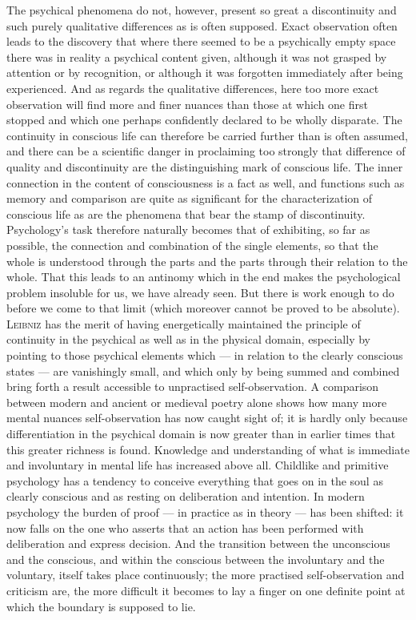 \documentclass[12pt,a4paper]{book}
\newcommand{\opage}[1]{\marginnote{\footnotesize\textit{[#1]}}}
\begin{document}
The psychical phenomena do not, however, present so great a discontinuity and
such purely qualitative differences as is often supposed. Exact observation
often leads to the discovery that where there seemed to be a psychically empty
space there was in reality a psychical content given, although it was not
grasped by attention or by recognition, or although it was forgotten
immediately after being experienced. And as regards the qualitative differences,
here too more exact observation will find more and finer nuances than those at
which one first stopped and which one perhaps confidently \opage{19}declared to be wholly
disparate. The continuity in conscious life can therefore be carried further
than is often assumed, and there can be a scientific danger in proclaiming too
strongly that difference of quality and discontinuity are the distinguishing
mark of conscious life. The inner connection in the content of consciousness is
a fact as well, and functions such as memory and comparison are quite as
significant for the characterization of conscious life as are the phenomena that
bear the stamp of discontinuity. Psychology's task therefore naturally becomes
that of exhibiting, so far as possible, the connection and combination of the
single elements, so that the whole is understood through the parts and the parts
through their relation to the whole. That this leads to an antinomy which in the
end makes the psychological problem insoluble for us, we have already seen. But
there is work enough to do before we come to that limit (which moreover cannot
be proved to be absolute). \textsc{Leibniz} has the merit of having energetically
maintained the principle of continuity in the psychical as well as in the
physical domain, especially by pointing to those psychical elements which ---
in relation to the clearly conscious states --- are vanishingly small, and which
only by being summed and combined bring forth a result accessible to unpractised
self-observation. A comparison between modern and ancient or medieval poetry
alone shows how many more mental nuances self-observation has now caught sight
of; it is hardly only because differentiation in the psychical domain is now
greater than in earlier times that this greater richness is found. Knowledge and
understanding of what is immediate and involuntary in mental life has increased
above all. Childlike and primitive psychology has a tendency to conceive
everything that goes on in the soul as clearly conscious and as resting on
deliberation and intention. In modern psychology the burden of proof --- in
practice as in theory --- has been shifted: it now falls on the one who asserts
that an action has been performed with deliberation and express decision. And
the transition between the unconscious and the conscious, and within the
conscious between the involuntary and the voluntary, itself takes place
continuously; the more practised self-observation and \opage{20}criticism are, the more
difficult it becomes to lay a finger on one definite point at which the boundary
is supposed to lie.
\end{document}
